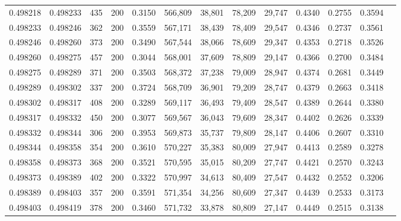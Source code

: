 \begin{tabular}{rrrrrrrrrrrrr}
0.498218 & 0.498233 &    435 & 200 &                                     0.3150 & 566,809 &  38,801 &  78,209 &  29,747 & 0.4340 & 0.2755 & 0.3594 \\
0.498233 & 0.498246 &    362 & 200 &                                     0.3559 & 567,171 &  38,439 &  78,409 &  29,547 & 0.4346 & 0.2737 & 0.3561 \\
0.498246 & 0.498260 &    373 & 200 &                                     0.3490 & 567,544 &  38,066 &  78,609 &  29,347 & 0.4353 & 0.2718 & 0.3526 \\
0.498260 & 0.498275 &    457 & 200 &                                     0.3044 & 568,001 &  37,609 &  78,809 &  29,147 & 0.4366 & 0.2700 & 0.3484 \\
0.498275 & 0.498289 &    371 & 200 &                                     0.3503 & 568,372 &  37,238 &  79,009 &  28,947 & 0.4374 & 0.2681 & 0.3449 \\
0.498289 & 0.498302 &    337 & 200 &                                     0.3724 & 568,709 &  36,901 &  79,209 &  28,747 & 0.4379 & 0.2663 & 0.3418 \\
0.498302 & 0.498317 &    408 & 200 &                                     0.3289 & 569,117 &  36,493 &  79,409 &  28,547 & 0.4389 & 0.2644 & 0.3380 \\
0.498317 & 0.498332 &    450 & 200 &                                     0.3077 & 569,567 &  36,043 &  79,609 &  28,347 & 0.4402 & 0.2626 & 0.3339 \\
0.498332 & 0.498344 &    306 & 200 &                                     0.3953 & 569,873 &  35,737 &  79,809 &  28,147 & 0.4406 & 0.2607 & 0.3310 \\
0.498344 & 0.498358 &    354 & 200 &                                     0.3610 & 570,227 &  35,383 &  80,009 &  27,947 & 0.4413 & 0.2589 & 0.3278 \\
0.498358 & 0.498373 &    368 & 200 &                                     0.3521 & 570,595 &  35,015 &  80,209 &  27,747 & 0.4421 & 0.2570 & 0.3243 \\
0.498373 & 0.498389 &    402 & 200 &                                     0.3322 & 570,997 &  34,613 &  80,409 &  27,547 & 0.4432 & 0.2552 & 0.3206 \\
0.498389 & 0.498403 &    357 & 200 &                                     0.3591 & 571,354 &  34,256 &  80,609 &  27,347 & 0.4439 & 0.2533 & 0.3173 \\
0.498403 & 0.498419 &    378 & 200 &                                     0.3460 & 571,732 &  33,878 &  80,809 &  27,147 & 0.4449 & 0.2515 & 0.3138 \\

\end{tabular}

